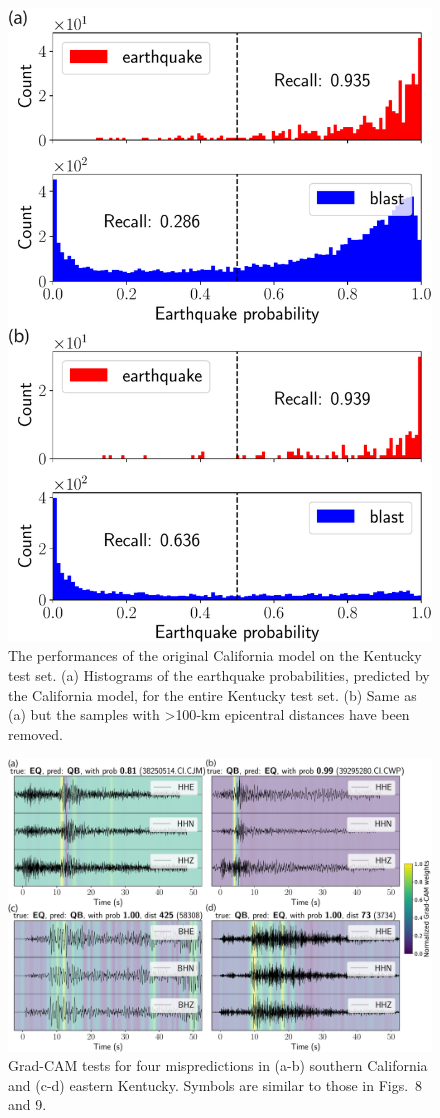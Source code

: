 \documentclass[12pt]{article}
\begin{document}
\begin{figure}
        \centering
	\includegraphics[width=.5\textwidth]{socal_ek.pdf}
	\caption{The performances of the original California model on the Kentucky test set. (a) Histograms of the earthquake probabilities, predicted by the California model, for the entire Kentucky test set. (b) Same as (a) but the samples with \textgreater{100}-km epicentral distances have been removed.}
\end{figure}

\begin{figure}
        \centering
	\includegraphics[width=.98\textwidth]{grad_CAM_misprediction.pdf}
	\caption{Grad-CAM tests for four mispredictions in (a-b) southern California and (c-d) eastern Kentucky. Symbols are similar to those in Figs.~8 and 9.}
\end{figure}
\end{document}
